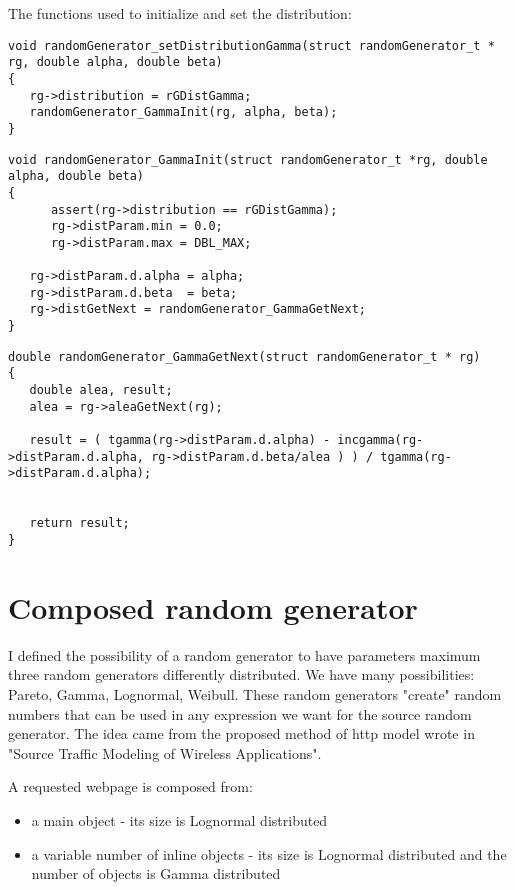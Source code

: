 The functions used to initialize and set the distribution:
\begin{verbatim}
void randomGenerator_setDistributionGamma(struct randomGenerator_t * rg, double alpha, double beta)
{
   rg->distribution = rGDistGamma;
   randomGenerator_GammaInit(rg, alpha, beta);
} 
\end{verbatim}


\begin{verbatim}
void randomGenerator_GammaInit(struct randomGenerator_t *rg, double alpha, double beta)
{
      assert(rg->distribution == rGDistGamma);   
      rg->distParam.min = 0.0;
      rg->distParam.max = DBL_MAX;
  
   rg->distParam.d.alpha = alpha;
   rg->distParam.d.beta  = beta; 
   rg->distGetNext = randomGenerator_GammaGetNext;
}
\end{verbatim}

\begin{verbatim}
double randomGenerator_GammaGetNext(struct randomGenerator_t * rg)
{
   double alea, result;
   alea = rg->aleaGetNext(rg);

   result = ( tgamma(rg->distParam.d.alpha) - incgamma(rg->distParam.d.alpha, rg->distParam.d.beta/alea ) ) / tgamma(rg->distParam.d.alpha); 
  
  
   return result;
}
\end{verbatim}

\section{Composed random generator}

   I defined the possibility of a random generator to have parameters maximum three random generators differently distributed. We have many possibilities: Pareto, Gamma, Lognormal, Weibull. These random generators "create" random numbers that can be used in any expression we want for the source random generator.
The idea came from the proposed method of http model wrote in "Source Traffic Modeling of Wireless Applications".

A requested webpage is composed from:
\begin{itemize}
\item{a main object} - its size is Lognormal distributed
\item{a variable number of inline objects} - its size is Lognormal distributed and the number of objects is Gamma distributed
\end{itemize}


